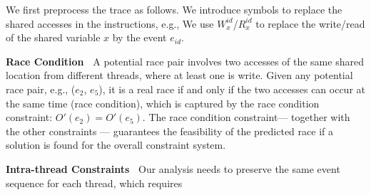 

We first preprocess the trace as follows. We introduce symbols to replace 
the shared accesses in the instructions, e.g., We use 
$W^{id}_{x}$/$R^{id}_{x}$ to replace the write/read of the shared 
variable $x$ by the 
event $e_{id}$. %

{\bf Race Condition\ } A potential race pair involves two accesses of 
the same shared location from different threads, where at least one is write. 
Given any potential race pair, e.g., ($e_2$, $e_5$), it is a real race 
if and only if the two accesses can occur at the same time (race condition), 
which is captured by the race condition constraint: $O'(e_2) = O'(e_5)$.
The race condition constraint--- together with the other constraints --- 
guarantees the feasibility of the predicted race if a solution is found 
for the overall constraint system.

{\bf Intra-thread Constraints\ } Our analysis needs to preserve the 
same event sequence for each thread, which requires 


